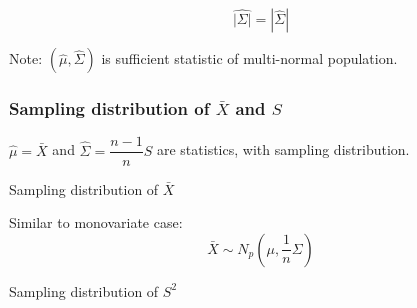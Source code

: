    \begin{equation}
        \widehat{|\Sigma |} =|\hat{\Sigma } | 
    \end{equation}
    
    
        Note: $ (\hat{\mu} , \hat{\Sigma} ) $ is sufficient statistic of multi-normal population.







    
        
\subsubsection{Sampling distribution of $ \bar{X} $ and $ S $}\label{SubSubSectionMultivariateNormalSamplingDistribution}
        $ \hat{\mu}=\bar{X} $ and $ \hat{\Sigma}=\dfrac{n-1}{n}S $ are statistics, with sampling distribution.



    \begin{point}
        Sampling distribution of $ \bar{X} $
    \end{point}

    Similar to monovariate case:
    \begin{equation}
        \bar{X}\sim N_p(\mu,\dfrac{1}{n}\Sigma ) 
    \end{equation}
    
    \begin{point}
        Sampling distribution of $ S^2 $
    \end{point}
    
